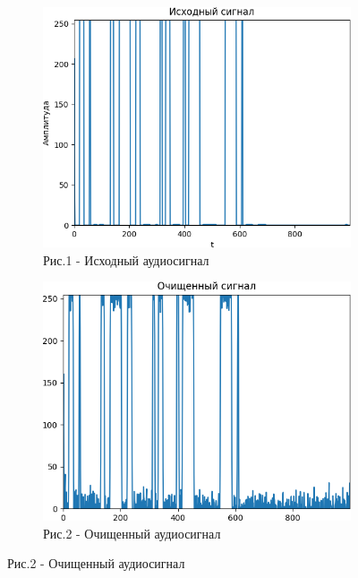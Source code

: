 \begin{figure}[H]
   \centering
   \begin{subfigure}{0.45\textwidth}
   	\centering
   	\includegraphics[width=\textwidth,height=0.8\textwidth]{media/ict/image64}
   	\caption*{Рис.1 - Исходный аудиосигнал}
   \end{subfigure}
   \begin{subfigure}{0.45\textwidth}
   	\centering
   	\includegraphics[width=\textwidth,height=0.8\textwidth]{media/ict/image65}
   	\caption*{Рис.2 - Очищенный аудиосигнал}
   \end{subfigure}
\end{figure}

